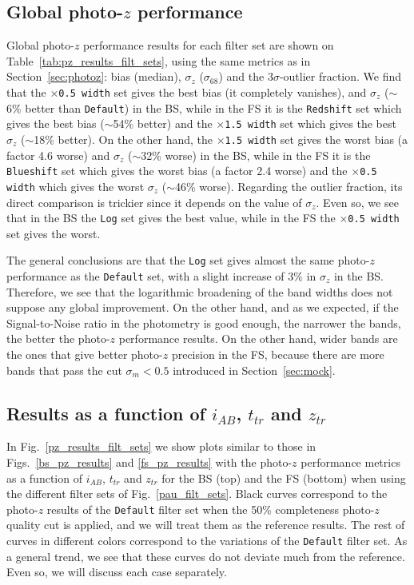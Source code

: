 \subsection{Global photo-$z$ performance}
Global photo-$z$ performance results for each filter set are shown on Table~\ref{tab:pz_results_filt_sets}, using the same metrics as in Section~\ref{sec:photoz}: bias (median), $\sigma_z$ ($\sigma_{68}$) and the $3\sigma$-outlier fraction. We find that the \texttt{$\times$0.5 width} set gives the best bias (it completely vanishes), and $\sigma_z$ ($\sim$6\% better than \texttt{Default}) in the BS, while in the FS it is the \texttt{Redshift} set which gives the best bias ($\sim$54\% better) and the \texttt{$\times$1.5 width} set which gives the best $\sigma_z$ ($\sim$18\% better). On the other hand, the \texttt{$\times$1.5 width} set gives the worst bias (a factor 4.6 worse) and $\sigma_z$ ($\sim$32\% worse) in the BS, while in the FS it is the \texttt{Blueshift} set which gives the worst bias (a factor 2.4 worse) and the \texttt{$\times$0.5 width} which gives the worst $\sigma_z$ ($\sim$46\% worse). Regarding the outlier fraction, its direct comparison is trickier since it depends on the value of $\sigma_z$. Even so, we see that in the BS the \texttt{Log} set gives the best value, while in the FS the \texttt{$\times$0.5 width} set gives the worst. 

The general conclusions are that the \texttt{Log} set gives almost the same photo-$z$ performance as the \texttt{Default} set, with a slight increase of $3\%$ in $\sigma_z$ in the BS. Therefore, we see that the logarithmic broadening of the band widths does not suppose any global improvement. On the other hand, and as we expected, if the Signal-to-Noise ratio in the photometry is good enough, the narrower the bands, the better the photo-$z$ performance results. On the other hand, wider bands are the ones that give better photo-$z$ precision in the FS, because there are more bands that pass the cut $\sigma_m<0.5$ introduced in Section~\ref{sec:mock}. 

\subsection{Results as a function of $i_{AB}$, $t_{tr}$ and $z_{tr}$}
In Fig.~\ref{pz_results_filt_sets} we show plots similar to those in Figs.~\ref{bs_pz_results} and \ref{fs_pz_results} with the photo-$z$ performance metrics as a function of $i_{AB}$, $t_{tr}$ and $z_{tr}$ for the BS (top) and the FS (bottom) when using the different filter sets of Fig.~\ref{pau_filt_sets}. Black curves correspond to the photo-$z$ results of the \texttt{Default} filter set when the 50\% completeness photo-$z$ quality cut is applied, and we will treat them as the reference results. The rest of curves in different colors correspond to the variations of the \texttt{Default} filter set. As a general trend, we see that these curves do not deviate much from the reference. Even so, we will discuss each case separately. 

